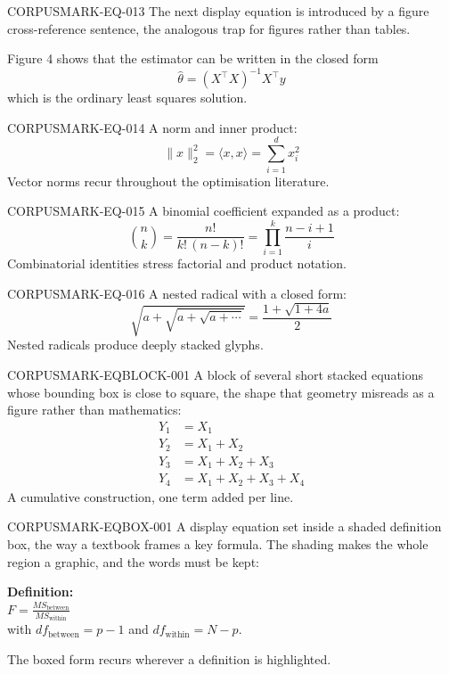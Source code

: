 \documentclass[11pt,a4paper]{article}
\begin{document}
CORPUSMARK-EQ-013 The next display equation is introduced by a figure cross-reference sentence,
the analogous trap for figures rather than tables.

Figure 4 shows that the estimator can be written in the closed form
\begin{equation}
\hat{\theta} = \left( X^{\top} X \right)^{-1} X^{\top} y
\end{equation}
which is the ordinary least squares solution.

CORPUSMARK-EQ-014 A norm and inner product:
\begin{equation}
\lVert x \rVert_{2}^{2} = \langle x, x \rangle = \sum_{i=1}^{d} x_{i}^{2}
\end{equation}
Vector norms recur throughout the optimisation literature.

CORPUSMARK-EQ-015 A binomial coefficient expanded as a product:
\begin{equation}
\binom{n}{k} = \frac{n!}{k!\,(n-k)!} = \prod_{i=1}^{k} \frac{n - i + 1}{i}
\end{equation}
Combinatorial identities stress factorial and product notation.

CORPUSMARK-EQ-016 A nested radical with a closed form:
\begin{equation}
\sqrt{a + \sqrt{a + \sqrt{a + \cdots}}} = \frac{1 + \sqrt{1 + 4a}}{2}
\end{equation}
Nested radicals produce deeply stacked glyphs.

CORPUSMARK-EQBLOCK-001 A block of several short stacked equations whose bounding box is close to
square, the shape that geometry misreads as a figure rather than mathematics:
\begin{equation}
\begin{aligned}
Y_{1} &= X_{1} \\
Y_{2} &= X_{1} + X_{2} \\
Y_{3} &= X_{1} + X_{2} + X_{3} \\
Y_{4} &= X_{1} + X_{2} + X_{3} + X_{4}
\end{aligned}
\end{equation}
A cumulative construction, one term added per line.

CORPUSMARK-EQBOX-001 A display equation set inside a shaded definition box, the way a textbook
frames a key formula. The shading makes the whole region a graphic, and the words must be kept:
\begin{center}
\colorbox{black!10}{\parbox{0.75\linewidth}{\centering
\textbf{Definition:}\\[1mm]
$\displaystyle F = \frac{MS_{\text{between}}}{MS_{\text{within}}}$\\[1mm]
with $df_{\text{between}} = p - 1$ and $df_{\text{within}} = N - p$.}}
\end{center}
The boxed form recurs wherever a definition is highlighted.
\end{document}

